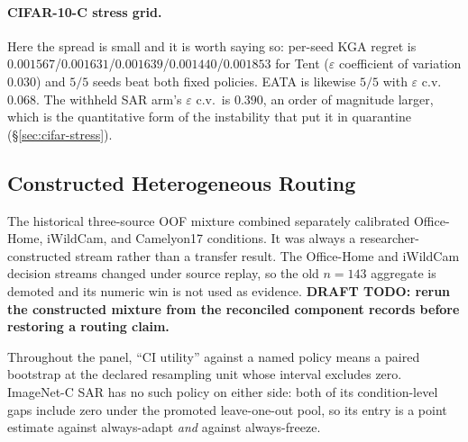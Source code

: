 \paragraph{CIFAR-10-C stress grid.} Here the spread is small and it is worth saying so: per-seed
\textsc{KGA} regret is $0.001567$/$0.001631$/$0.001639$/$0.001440$/$0.001853$ for Tent
($\varepsilon$ coefficient of variation $0.030$) and $5/5$ seeds beat both fixed policies. EATA is
likewise $5/5$ with $\varepsilon$ c.v.\ $0.068$. The withheld SAR arm's $\varepsilon$ c.v.\ is
$0.390$, an order of magnitude larger, which is the quantitative form of the instability that put it
in quarantine (\S\ref{sec:cifar-stress}).

\subsection{Constructed Heterogeneous Routing}\label{sec:constructed-routing}
The historical three-source OOF mixture combined separately calibrated Office-Home, iWildCam, and
Camelyon17 conditions. It was always a researcher-constructed stream rather than a transfer result.
The Office-Home and iWildCam decision streams changed under source replay, so the old $n=143$
aggregate is demoted and its numeric win is not used as evidence. \textbf{DRAFT TODO: rerun the
constructed mixture from the reconciled component records before restoring a routing claim.}

\noindent Throughout the panel, ``CI utility'' against a named policy means a paired bootstrap at
the declared resampling unit whose interval excludes zero. ImageNet-C SAR has no such policy on
either side: both of its condition-level gaps include zero under the promoted leave-one-out pool,
so its entry is a point estimate against always-adapt \emph{and} against always-freeze.

